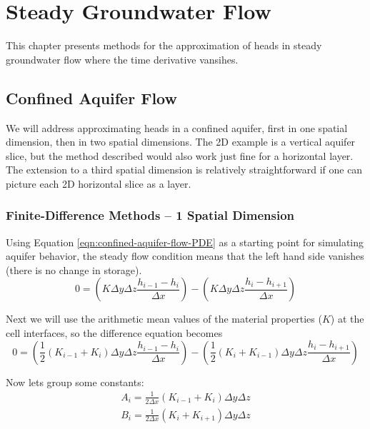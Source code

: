 \section{Steady Groundwater Flow}
This chapter presents methods for the approximation of heads in steady groundwater flow where the time derivative vansihes.


\subsection{Confined Aquifer Flow}
We will address approximating heads in a confined aquifer, first in one spatial dimension, then in two spatial dimensions. 
The 2D example is a vertical aquifer slice, but the method described would also work just fine for a horizontal layer.
The extension to a third spatial dimension is relatively straightforward if one can picture each 2D horizontal slice as a layer.

\subsubsection{Finite-Difference Methods -- 1 Spatial Dimension}
Using Equation \ref{eqn:confined-aquifer-flow-PDE} as a starting point for simulating aquifer behavior, the steady flow condition means that the left hand side vanishes (there is no change in storage).
 \begin{equation}
0 = 
(K \Delta y \Delta z \frac{h_{i-1} - h_{i}}{\Delta x}) - 
(K \Delta y \Delta z \frac{h_{i} - h_{i+1}}{\Delta x})
\end{equation}

Next we will use the arithmetic mean values of the material properties ($K$) at the cell interfaces, so the difference equation becomes
 \begin{equation}
0 = 
(\frac{1}{2}(K_{i-1}+K_{i}) \Delta y \Delta z \frac{h_{i-1} - h_{i}}{\Delta x}) - 
(\frac{1}{2}(K_{i}+K_{i-1}) \Delta y \Delta z \frac{h_{i} - h_{i+1}}{\Delta x})
\end{equation}

Now lets group some constants:
\begin{equation}
\begin{matrix}
A_{i} = \frac{1}{2 \Delta x}(K_{i-1}+K_{i}) \Delta y \Delta z \\
B_{i} = \frac{1}{2 \Delta x}(K_{i}+K_{i+1}) \Delta y \Delta z
\end{matrix}
\end{equation}

